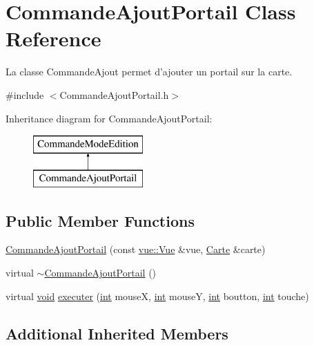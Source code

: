 \hypertarget{class_commande_ajout_portail}{\section{Commande\-Ajout\-Portail Class Reference}
\label{class_commande_ajout_portail}
}


La classe Commande\-Ajout permet d'ajouter un portail sur la carte.  




{\ttfamily \#include $<$Commande\-Ajout\-Portail.\-h$>$}

Inheritance diagram for Commande\-Ajout\-Portail\-:\begin{figure}[H]
\begin{center}
\leavevmode
\includegraphics[height=2.000000cm]{class_commande_ajout_portail}
\end{center}
\end{figure}
\subsection*{Public Member Functions}
\begin{DoxyCompactItemize}
\item 
\hyperlink{class_commande_ajout_portail_a9bb23c57a5e651761ef1f2942c8beb34}{Commande\-Ajout\-Portail} (const \hyperlink{classvue_1_1_vue}{vue\-::\-Vue} \&vue, \hyperlink{class_carte}{Carte} \&carte)
\item 
virtual \hyperlink{class_commande_ajout_portail_aa146f3ca92f445cba4770a586a29c163}{$\sim$\-Commande\-Ajout\-Portail} ()
\item 
virtual \hyperlink{wglew_8h_aeea6e3dfae3acf232096f57d2d57f084}{void} \hyperlink{class_commande_ajout_portail_a1b5ac4fd38f34e785aa61a3ce6fd5702}{executer} (\hyperlink{wglew_8h_a500a82aecba06f4550f6849b8099ca21}{int} mouse\-X, \hyperlink{wglew_8h_a500a82aecba06f4550f6849b8099ca21}{int} mouse\-Y, \hyperlink{wglew_8h_a500a82aecba06f4550f6849b8099ca21}{int} boutton, \hyperlink{wglew_8h_a500a82aecba06f4550f6849b8099ca21}{int} touche)
\end{DoxyCompactItemize}
\subsection*{Additional Inherited Members}


